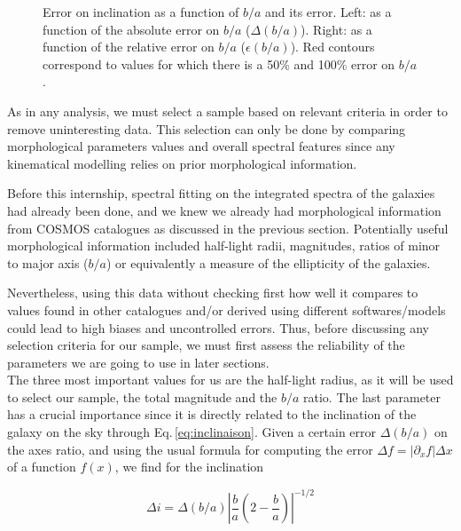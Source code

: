 \begin{figure}[H]
\begin{minipage}[c]{0.49\linewidth}
	\end{minipage}
	\caption[Error on inclination as a function of $b/a$ and its error.]{Error on inclination as a function of $b/a$ and its error. Left: as a function of the absolute error on $b/a$ ($\Delta (b/a)$). Right: as a function of the relative error on $b/a$ ($\epsilon ( b/a)$). Red contours correspond to values for which there is a 50\% and 100\% error on $b/a$.}
	\label{fig:erreur_inclinaison}
\end{figure}

As in any analysis, we must select a sample based on relevant criteria in order to remove uninteresting data. This selection can only be done by comparing morphological parameters values and overall spectral features since any kinematical modelling relies on prior morphological information. 

Before this internship, spectral fitting on the integrated spectra of the galaxies had already been done, and we knew we already had morphological information from COSMOS catalogues as discussed in the previous section. Potentially useful morphological information included half-light radii, magnitudes, ratios of minor to major axis ($b/a$) or equivalently a measure of the ellipticity of the galaxies. 

Nevertheless, using this data without checking first how well it compares to values found in other catalogues and/or derived using different softwares/models could lead to high biases and uncontrolled errors. Thus, before discussing any selection criteria for our sample, we must first assess the reliability of the parameters we are going to use in later sections. \\

The three most important values for us are the half-light radius, as it will be used to select our sample, the total magnitude and the $b/a$ ratio. The last parameter has a crucial importance since it is directly related to the inclination of the galaxy on the sky through Eq.\,\ref{eq:inclinaison}. Given a certain error $\Delta (b/a)$ on the axes ratio, and using the usual formula for computing the error $\Delta f = | \partial_x f | \Delta x$ of a function $f(x)$, we find for the inclination

\begin{equation}
	\Delta i = \Delta (b/a) \left | \frac{b}{a} \left ( 2 - \frac{b}{a} \right ) \right | ^{-1/2}
\end{equation}

